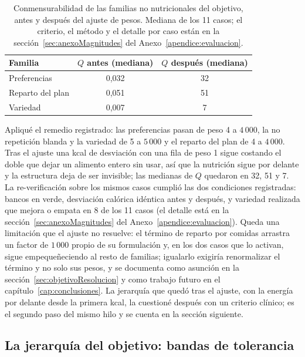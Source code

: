 \begin{table}[htbp]
\centering
\small
\begin{tabular}{|l|c|c|}
\hline
\textbf{Familia} & \textbf{$Q$ antes (mediana)} & \textbf{$Q$ después (mediana)} \\
\hline
Preferencias & 0,032 & 32 \\
\hline
Reparto del plan & 0,051 & 51 \\
\hline
Variedad & 0,007 & 7 \\
\hline
\end{tabular}
\caption{Conmensurabilidad de las familias no nutricionales del objetivo, antes y después del ajuste de pesos. Mediana de los 11 casos; el criterio, el método y el detalle por caso están en la sección~\ref{sec:anexoMagnitudes} del Anexo~\ref{apendice:evaluacion}.}
\label{tab:magnitudesQ}
\end{table}

Apliqué el remedio registrado: las preferencias pasan de peso 4 a $4\,000$, la no repetición blanda y la variedad de 5 a $5\,000$ y el reparto del plan de 4 a $4\,000$. Tras el ajuste una kcal de desviación con una fila de peso 1 sigue costando el doble que dejar un alimento entero sin usar, así que la nutrición sigue por delante y la estructura deja de ser invisible; las medianas de $Q$ quedaron en 32, 51 y 7. La re-verificación sobre los mismos casos cumplió las dos condiciones registradas: bancos en verde, desviación calórica idéntica antes y después, y variedad realizada que mejora o empata en 8 de los 11 casos (el detalle está en la sección~\ref{sec:anexoMagnitudes} del Anexo~\ref{apendice:evaluacion}). Queda una limitación que el ajuste no resuelve: el término de reparto por comidas arrastra un factor de $1\,000$ propio de su formulación y, en los dos casos que lo activan, sigue empequeñeciendo al resto de familias; igualarlo exigiría renormalizar el término y no solo sus pesos, y se documenta como asunción en la sección~\ref{sec:objetivoResolucion} y como trabajo futuro en el capítulo~\ref{cap:conclusiones}. La jerarquía que quedó tras el ajuste, con la energía por delante desde la primera kcal, la cuestioné después con un criterio clínico; es el segundo paso del mismo hilo y se cuenta en la sección siguiente.

\subsection{La jerarquía del objetivo: bandas de tolerancia}
\label{sec:evalBandas}

